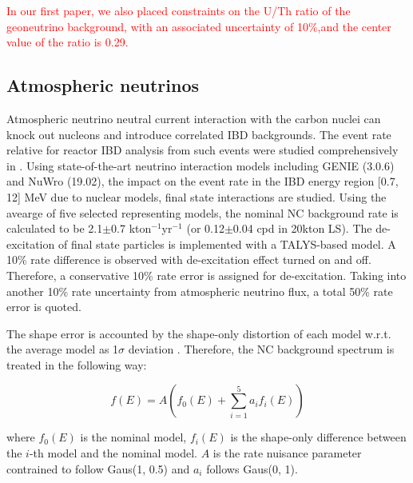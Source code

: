 \textcolor{red}{In our first paper, we also placed constraints on the U/Th ratio of the geoneutrino background, with an associated uncertainty of 10$\%$,and the center value of the ratio is 0.29.}

\subsection{Atmospheric neutrinos}
Atmospheric neutrino neutral current interaction with the carbon nuclei can knock out nucleons and introduce correlated IBD backgrounds. The event rate relative for reactor IBD analysis from such events were studied comprehensively in \cite{nc_epjc_2024}. Using state-of-the-art neutrino interaction models including GENIE (3.0.6) and NuWro (19.02), the impact on the event rate in the IBD energy region [0.7, 12] MeV due to nuclear models, final state interactions are studied. Using the avearge of five selected representing models, the nominal NC background rate is calculated to be 2.1$\pm$0.7 kton$^{-1}$yr$^{-1}$ (or 0.12$\pm$0.04 cpd in 20kton LS). The de-excitation of final state particles is implemented with a TALYS-based model. A 10\% rate difference is observed with de-excitation effect turned on and off. Therefore, a conservative 10\% rate error is assigned for de-excitation. Taking into another 10\% rate uncertainty from atmospheric neutrino flux, a total 50\% rate error is quoted.

The shape error is accounted by the shape-only distortion of each model w.r.t. the average model as 1$\sigma$ deviation \cite{nc_nominal}. Therefore, the NC background spectrum is treated in the following way:

\begin{equation}
    f(E) = A(f_0(E) + \sum_{i=1}^{5}a_if_i(E) )
\end{equation}

where $f_0(E)$ is the nominal model, $f_i(E)$ is the shape-only difference between the $i$-th model and the nominal model. $A$ is the rate nuisance parameter contrained to follow Gaus(1, 0.5) and $a_i$ follows Gaus(0, 1).

